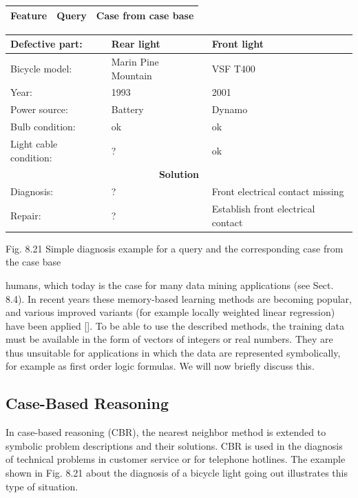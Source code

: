 \documentclass[10pt]{book}
\begin{document}
\begin{center}
\begin{tabular}{|l|l|l|}
\hline
Feature & Query & Case from case base \\
\hline
\end{tabular}
\end{center}
\begin{center}
\begin{tabular}{|l|l|l|}
\hline
Defective part: & Rear light & Front light \\
\hline
Bicycle model: & Marin Pine Mountain & VSF T400 \\
\hline
Year: & 1993 & 2001 \\
\hline
Power source: & Battery & Dynamo \\
\hline
Bulb condition: & ok & ok \\
\hline
Light cable condition: & ? & ok \\
\hline
\multicolumn{3}{|c|}{\textbf{Solution}} \\
\hline
Diagnosis: & ? & Front electrical contact missing \\
\hline
Repair: & ? & Establish front electrical contact \\
\hline
\end{tabular}
\end{center}

Fig. 8.21 Simple diagnosis example for a query and the corresponding case from the case base

humans, which today is the case for many data mining applications (see Sect. 8.4). In recent years these memory-based learning methods are becoming popular, and various improved variants (for example locally weighted linear regression) have been applied [\cite{cleveland1979loess}].
To be able to use the described methods, the training data must be available in the form of vectors of integers or real numbers. They are thus unsuitable for applications in which the data are represented symbolically, for example as first order logic formulas. We will now briefly discuss this.

\subsection{Case-Based Reasoning}
In case-based reasoning (CBR), the nearest neighbor method is extended to symbolic problem descriptions and their solutions. CBR is used in the diagnosis of technical problems in customer service or for telephone hotlines. The example shown in Fig. 8.21 about the diagnosis of a bicycle light going out illustrates this type of situation.
\end{document}
